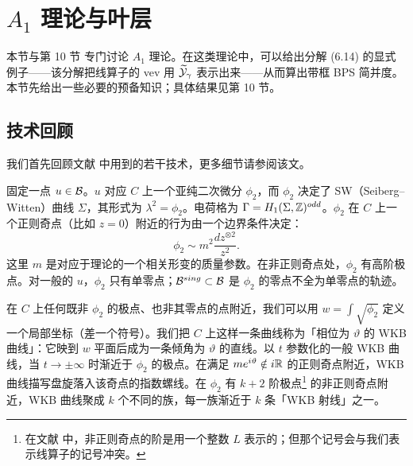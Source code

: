 
\section{$A_1$ 理论与叶层}
\label{sec:A1}

本节与第 10 节%
专门讨论 $A_1$ 理论。在这类理论中，可以给出分解 (6.14)%
的显式例子——该分解把线算子的 vev 用 $\widetilde{\cal Y}_\gamma$ 表示出来——从而算出带框 BPS 简并度。本节先给出一些必要的预备知识；具体结果见第 10 节。%

\subsection{技术回顾}

我们首先回顾文献 \cite{Gaiotto:2009hg} 中用到的若干技术，更多细节请参阅该文。

固定一点 $u \in \mathcal{B}$。$u$ 对应 $C$ 上一个亚纯二次微分 $\phi_2$，而 $\phi_2$ 决定了 SW（Seiberg--Witten）曲线 $\Sigma$，其形式为 $\lambda^2 = \phi_2$。电荷格为 $\Gamma = H_1(\Sigma, \mathbb{Z})^{odd}$。$\phi_2$ 在 $C$ 上一个正则奇点（比如 $z = 0$）附近的行为由一个边界条件决定：
\begin{equation}
 \phi_2 \sim m^2 \frac{dz^{\otimes 2}}{z^2}.
\end{equation}
这里 $m$ 是对应于理论的一个相关形变的质量参数。在非正则奇点处，$\phi_2$ 有高阶极点。对一般的 $u$，$\phi_2$ 只有单零点；$\mathcal{B}^{sing} \subset \mathcal{B}$ 是 $\phi_2$ 的零点不全为单零点的轨迹。

在 $C$ 上任何既非 $\phi_2$ 的极点、也非其零点的点附近，我们可以用 $w = \int \sqrt{\phi_2}$ 定义一个局部坐标（差一个符号）。我们把 $C$ 上这样一条曲线称为「相位为 $\vartheta$ 的 WKB 曲线」：它映到 $w$ 平面后成为一条倾角为 $\vartheta$ 的直线。以 $t$ 参数化的一般 WKB 曲线，当 $t \to \pm\infty$ 时渐近于 $\phi_2$ 的极点。在满足 $m e^{i\vartheta} \notin i\mathbb{R}$ 的正则奇点附近，WKB 曲线描写盘旋落入该奇点的指数螺线。在 $\phi_2$ 有 $k+2$ 阶极点\footnote{在文献 \cite{Gaiotto:2009hg} 中，非正则奇点的阶是用一个整数 $L$ 表示的；但那个记号会与我们表示线算子的记号冲突。}
的非正则奇点附近，WKB 曲线聚成 $k$ 个不同的族，每一族渐近于 $k$ 条「WKB 射线」之一。

